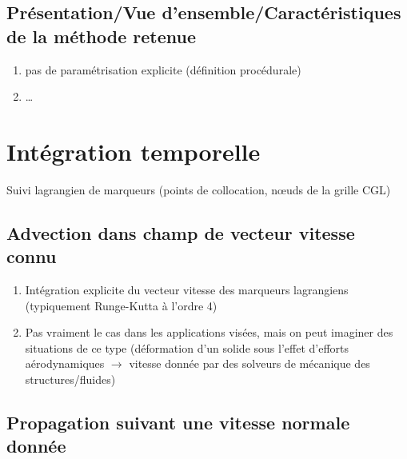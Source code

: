 \subsection{Présentation/Vue d'ensemble/Caractéristiques de la méthode retenue}
\begin{enumerate}
	\item pas de paramétrisation explicite (définition procédurale)
	\item \ldots
\end{enumerate}



\section{Intégration temporelle}
Suivi lagrangien de marqueurs (points de collocation, n\oe uds de la grille CGL)

\subsection{Advection dans champ de vecteur vitesse connu}
\begin{enumerate}
	\item Intégration explicite du vecteur vitesse des marqueurs lagrangiens (typiquement Runge-Kutta à l'ordre 4)
	\item Pas vraiment le cas dans les applications visées, mais on peut imaginer des situations de ce type (\eg déformation d'un solide sous l'effet d'efforts aérodynamiques $\to$ vitesse donnée par des solveurs de mécanique des structures/fluides)
\end{enumerate}



\subsection{Propagation suivant une vitesse normale donnée}
